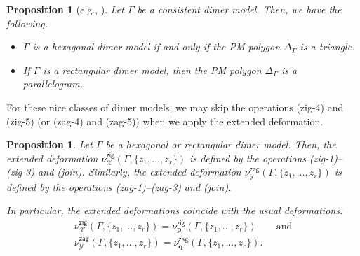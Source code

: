 \documentclass[pdftex]{sigma}%
\numberwithin{equation}{section}
\numberwithin{figure}{section}
\numberwithin{table}{section}
\newtheorem{Proposition}[Theorem]{Proposition}
 { \theoremstyle{definition}
\newtheorem{Definition}[Theorem]{Definition}
\newtheorem{Note}[Theorem]{Note}
\newtheorem{Example}[Theorem]{Example}
\newtheorem{Remark}[Theorem]{Remark}
\newtheorem{observation}[Theorem]{Observation}
\newtheorem{operation}[Theorem]{Operation}
\newtheorem{setting}[Theorem]{Setting}}
\newcommand{\calX}{\mathcal{X}}
\newcommand{\calY}{\mathcal{Y}}
\newcommand{\bfp}{\mathbf{p}}
\newcommand{\bfq}{\mathbf{q}}
\newcommand{\zig}{\mathsf{zig}}
\newcommand{\zag}{\mathsf{zag}}
\begin{document}
\begin{Proposition}[{e.g., \cite{IN,Nak_semisteady,UY}}]\label{char_hexagonal_square}
Let $\Gamma$ be a consistent dimer model. Then, we have the following.
\begin{itemize}\itemsep=0pt
\item[\rm (1)] $\Gamma$ is a hexagonal dimer model if and only if the PM polygon $\Delta_\Gamma$ is a triangle.
\item[\rm (2)] If $\Gamma$ is a rectangular dimer model, then the PM polygon $\Delta_\Gamma$ is a parallelogram.
\end{itemize}
\end{Proposition}

For these nice classes of dimer models, we may skip the operations (zig-4) and (zig-5) (or (zag-4) and (zag-5)) when we apply the extended deformation.

\begin{Proposition}\label{skip_hexagonal_square}
Let $\Gamma$ be a hexagonal or rectangular dimer model.
Then, the extended deformation $\nu_\calX^\zig(\Gamma,\{z_1,\dots,z_r\})$ is defined by the operations {\rm(zig-1)--(zig-3)} and {\rm(join)}.
Similarly, the extended deformation $\nu_\calY^\zag(\Gamma,\{z_1,\dots,z_r\})$ is defined by the operations {\rm(zag-1)--(zag-3)} and {\rm(join)}.

In particular, the extended deformations coincide with the usual deformations:
\begin{gather*}
\nu_\calX^\zig(\Gamma,\{z_1,\dots,z_r\})=\nu_\bfp^\zig(\Gamma,\{z_1,\dots,z_r\})\qquad \text{and} \\
\nu_\calY^\zag(\Gamma,\{z_1,\dots,z_r\})=\nu_\bfq^\zag(\Gamma,\{z_1,\dots,z_r\}).
\end{gather*}
\end{Proposition}
\end{document}
